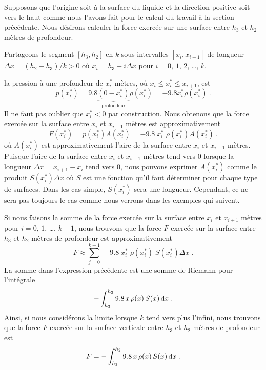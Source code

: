 {

Supposons que l'origine soit à la surface du liquide et la direction
positive soit vers le haut comme nous l'avons fait pour le calcul du travail
à la section précédente.  Nous désirons calculer la force exercée sur une
surface entre $h_3$ et $h_2$ mètres de profondeur.

Partageons le segment $[h_3,h_2]$ en $k$ sous intervalles
$[x_i,x_{i+1}]$ de longueur $\Delta x = (h_2-h_3)/k > 0$ où
$x_i = h_3 + i \Delta x$ pour $i=0$, $1$, $2$, \ldots , $k$.

la pression à une profondeur de $x_i^\ast$ mètres, où
$x_i \leq x_i^\ast \leq x_{i+1}$, est
\[
p(x_i^\ast) =  9.8 \underbrace{(0-x_i^\ast)}_{\text{profondeur}}
\rho(x_i^\ast) = - 9.8 x_i^\ast \rho(x_i^\ast) \ .
\]
Il ne faut pas oublier que $x_i^\ast <0$ par construction. Nous obtenons
que la force exercée sur la surface entre $x_i$ et $x_{i+1}$ mètres
est approximativement
\[
F(x_i^\ast) = p(x_i^\ast) A(x_i^\ast) = - 9.8 \; x_i^\ast \;
\rho(x_i^\ast) A(x_i^\ast) \ .
\]
où $A(x_i^\ast)$ est approximativement l'aire de la surface entre $x_i$ et
$x_{i+1}$ mètres.  Puisque l'aire de la surface entre $x_i$ et $x_{i+1}$
mètres tend vers $0$ lorsque la longueur $\Delta x = x_{i+1}-x_i$
tend vers $0$, nous pouvons exprimer $A(x_i^\ast)$ comme le produit
$S(x_i^\ast) \Delta x$ où $S$ est une fonction qu'il faut
déterminer pour chaque type de surfaces.  Dans les cas simple,
$S(x_i^\ast)$ sera une longueur.  Cependant, ce ne sera pas toujours le cas
comme nous verrons dans les exemples qui suivent.

Si nous faisons la somme de la force exercée sur la surface entre
$x_i$ et $x_{i+1}$ mètres pour $i=0$, $1$, \ldots , $k-1$, nous trouvons
que la force $F$ exercée sur la surface entre $h_3$ et $h_2$ mètres de
profondeur est approximativement
\[
F \approx \sum_{j=0}^{k-1}
- 9.8 \; x_i^\ast  \; \rho(x_i^\ast) \; S(x_i^\ast) \Delta x \; .
\]
La somme dans l'expression précédente est une somme de Riemann pour
l'intégrale
\[
- \int_{h_3}^{h_2} 9.8\, x\, \rho(x)\, S(x) \,\mathrm{d}x \; .
\]
Ainsi, si nous considérons la limite lorsque $k$ tend vers plus
l'infini, nous trouvons que la force $F$ exercée sur la surface
verticale entre $h_3$ et $h_2$ mètres de profondeur est
\begin{equation}\label{pression}
F = - \int_{h_3}^{h_2} 9.8 \, x \, \rho(x)\, S(x)\,\mathrm{d}x \; .
\end{equation}
 
}
